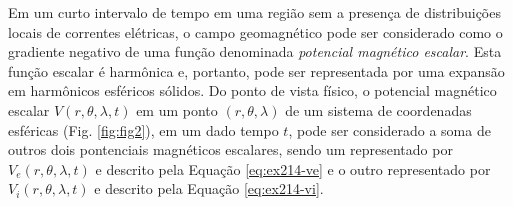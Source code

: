 \documentclass[10pt,a4paper,fleqn]{article}
\begin{document}
Em um curto intervalo de tempo em uma regi\~{a}o sem
a presen\c{c}a de distribui\c{c}\~{o}es locais de correntes 
el\'{e}tricas, o campo geomagn\'{e}tico pode 
ser considerado como o gradiente negativo de uma fun\c{c}\~{a}o
denominada \textit{potencial magn\'{e}tico escalar}.
Esta fun\c{c}\~{a}o escalar \'{e} harm\^{o}nica e, portanto, pode 
ser representada por uma expans\~{a}o em harm\^{o}nicos esf\'{e}ricos
s\'{o}lidos.
Do ponto de vista f\'{i}sico, o potencial magn\'{e}tico escalar
$V(r, \theta, \lambda, t)$ em um ponto $(r, \theta, \lambda)$ de um 
sistema de coordenadas esf\'{e}ricas (Fig. \ref{fig:fig2}), em um
dado tempo $t$, 
pode ser considerado a soma de outros dois pontenciais magn\'{e}ticos
escalares, sendo um representado por $V_{e}(r, \theta, \lambda, t)$ e 
descrito pela Equa\c{c}\~{a}o \ref{eq:ex214-ve} e o outro representado
por $V_{i}(r, \theta, \lambda, t)$ e descrito pela Equa\c{c}\~{a}o 
\ref{eq:ex214-vi}.
\end{document}
